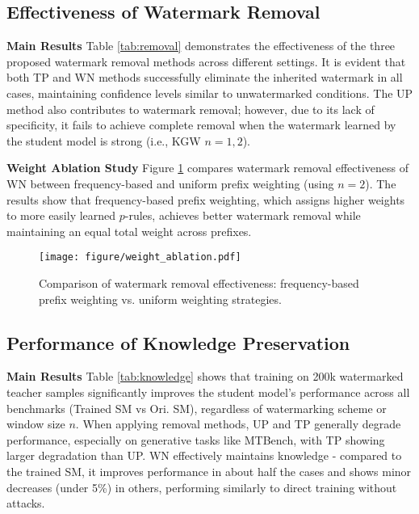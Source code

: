 \subsection{Effectiveness of Watermark Removal}

\textbf{Main Results} \quad Table \ref{tab:removal} demonstrates  the effectiveness of the three proposed watermark removal methods across different settings. It is evident that both TP and WN methods successfully eliminate the inherited watermark in all cases, maintaining confidence levels similar to unwatermarked conditions. The UP method also contributes to watermark removal; however, due to its lack of specificity, it fails to achieve complete removal when the watermark learned by the student model is strong (i.e., KGW $n=1,2$).

\vspace{3pt}

\noindent\textbf{Weight Ablation Study} \quad Figure \ref{fig:weight} compares watermark removal effectiveness of WN between frequency-based and uniform prefix weighting (using $n=2$). The results show that frequency-based prefix weighting, which assigns higher weights to more easily learned $p$-rules, achieves better watermark removal while maintaining an equal total weight across prefixes.
\begin{figure}[t]
    \centering
    \texttt{[image: figure/weight\_ablation.pdf]}
    \caption{Comparison of watermark removal effectiveness: frequency-based prefix weighting vs. uniform weighting strategies.}
    \label{fig:weight}
    \vspace{-15pt}
\end{figure}



\subsection{Performance of Knowledge Preservation}
\textbf{Main Results} \quad Table \ref{tab:knowledge} shows that training on 200k watermarked teacher samples significantly improves the student model's performance across all benchmarks (Trained SM vs Ori. SM), regardless of watermarking scheme or window size $n$. When applying removal methods, UP and TP generally degrade performance, especially on generative tasks like MTBench, with TP showing larger degradation than UP. WN effectively maintains knowledge - compared to the trained SM, it improves performance in about half the cases and shows minor decreases (under 5\%) in others, performing similarly to direct training without attacks.

